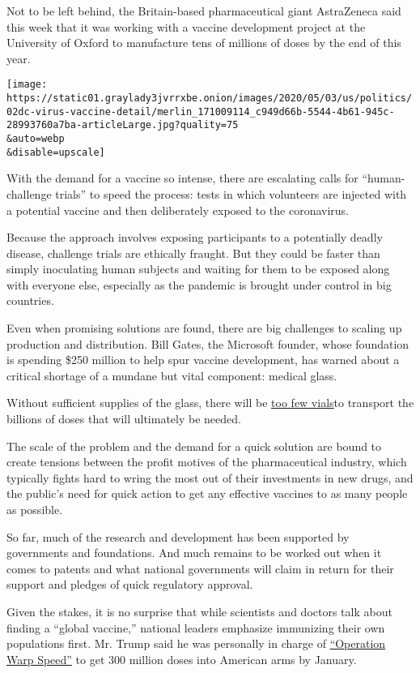 Not to be left behind, the Britain-based pharmaceutical giant
AstraZeneca said this week that it was working with a vaccine
development project at the University of Oxford to manufacture tens of
millions of doses by the end of this year.

\texttt{[image: https://static01.graylady3jvrrxbe.onion/images/2020/05/03/us/politics/02dc-virus-vaccine-detail/merlin\_171009114\_c949d66b-5544-4b61-945c-28993760a7ba-articleLarge.jpg?quality=75\\\&auto=webp\\\&disable=upscale]}

With the demand for a vaccine so intense, there are escalating calls for
``human-challenge trials'' to speed the process: tests in which
volunteers are injected with a potential vaccine and then deliberately
exposed to the coronavirus.

Because the approach involves exposing participants to a potentially
deadly disease, challenge trials are ethically fraught. But they could
be faster than simply inoculating human subjects and waiting for them to
be exposed along with everyone else, especially as the pandemic is
brought under control in big countries.

Even when promising solutions are found, there are big challenges to
scaling up production and distribution. Bill Gates, the Microsoft
founder, whose foundation is spending \$250 million to help spur vaccine
development, has warned about a critical shortage of a mundane but vital
component: medical glass.

Without sufficient supplies of the glass, there will be
\href{https://www.nytimes3xbfgragh.onion/2020/05/01/health/coronavirus-vaccine-supplies.html}{too
few vials}to transport the billions of doses that will ultimately be
needed.

The scale of the problem and the demand for a quick solution are bound
to create tensions between the profit motives of the pharmaceutical
industry, which typically fights hard to wring the most out of their
investments in new drugs, and the public's need for quick action to get
any effective vaccines to as many people as possible.

So far, much of the research and development has been supported by
governments and foundations. And much remains to be worked out when it
comes to patents and what national governments will claim in return for
their support and pledges of quick regulatory approval.

Given the stakes, it is no surprise that while scientists and doctors
talk about finding a ``global vaccine,'' national leaders emphasize
immunizing their own populations first. Mr. Trump said he was personally
in charge of
\href{https://www.nytimes3xbfgragh.onion/2020/04/29/us/politics/trump-coronavirus-vaccine-operation-warp-speed.html}{``Operation
Warp Speed''} to get 300 million doses into American arms by January.

